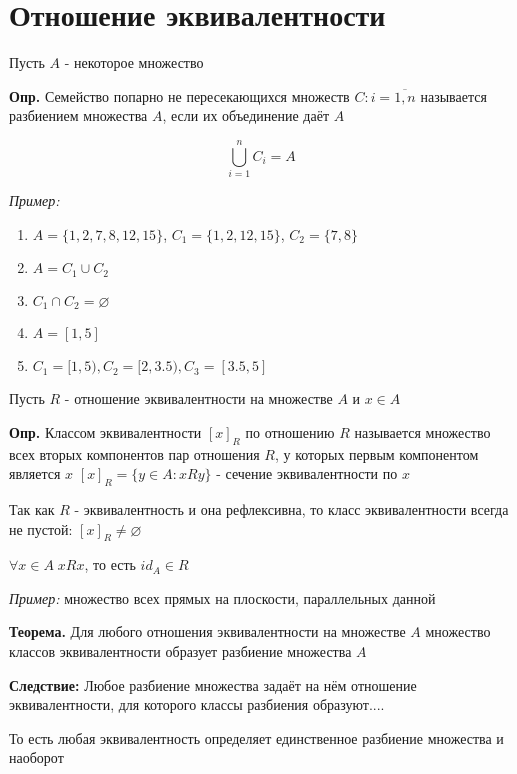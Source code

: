 \documentclass[10pt]{article}
\begin{document}
\section*{Отношение эквивалентности}
\par Пусть $A$ - некоторое множество
\par\textbf{Опр.} Семейство попарно не пересекающихся множеств $C: i = \overline{1, n}$ называется разбиением множества $A$, если их объединение даёт $A$
\par $$\bigcup_{i=1}^n C_{i} = A$$
\par\textit{Пример:}
\begin{enumerate}
    \item $A = \{ 1, 2, 7, 8, 12, 15 \}$, $C_1 = \{ 1, 2, 12, 15 \}$, $C_{2} = \{ 7, 8 \}$
    \item[] $A = C_{1} \cup C_{2}$
    \item[] $C_{1} \cap C_{2} = \varnothing$
    \item $A = [1, 5]$
    \item $C_{1} = [1, 5), C_{2}=[2, 3.5), C_{3} = [3.5, 5]$
\end{enumerate}

\par Пусть $R$ - отношение эквивалентности на множестве $A$ и $x \in A$
\par\textbf{Опр.} Классом эквивалентности $[x]_{R}$ по отношению $R$  называется множество всех вторых компонентов пар отношения $R$, у которых первым компонентом является $x$
$[x]_{R} = \{ y \in A: xRy \}$ - сечение эквивалентности по $x$
\par Так как $R$ - эквивалентность и она рефлексивна, то класс эквивалентности всегда не пустой: $[x]_{R} \not = \varnothing$
\par $\forall x \in A \; xRx$, то есть $id_{A} \in R$
\par\textit{Пример:} множество всех прямых на плоскости, параллельных данной

\par\textbf{Теорема.} Для любого отношения эквивалентности на множестве $A$ множество классов эквивалентности образует разбиение множества $A$
\par\textbf{Следствие:} Любое разбиение множества задаёт на нём отношение эквивалентности, для которого классы разбиения образуют....
\par То есть любая эквивалентность определяет единственное разбиение множества и наоборот
\end{document}

